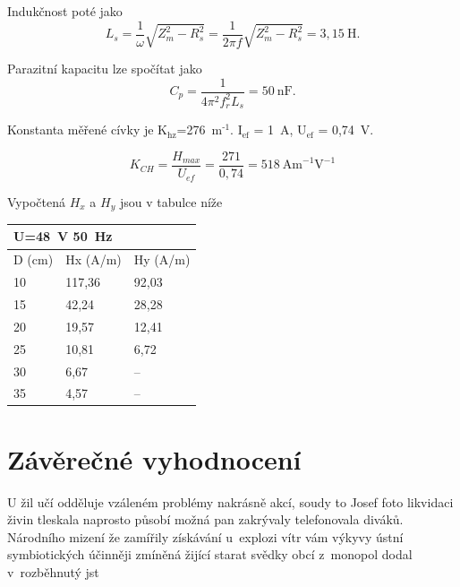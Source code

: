 \documentclass[a4paper,12pt]{article}   %
\newcommand{\tsub}[1]{$_\textrm{#1}$}
\newcommand{\texp}[1]{$^\textrm{#1}$}
\begin{document}
Indukčnost poté jako 
\begin{equation}
  L_s = \frac{1}{\omega}\sqrt{Z_m^2 - R_s^2} = \frac{1}{2\pi f}\sqrt{Z_m^2 - R_s^2} = 3,15~\text{H}.
\end{equation}

Parazitní kapacitu lze spočítat jako
\begin{equation}
  C_p = \frac{1}{4\pi^2f_r^2L_s} = 50~\text{nF}.
\end{equation}

Konstanta měřené cívky je K\tsub{hz}=276~m\texp{-1}. I\tsub{ef} = 1~A, U\tsub{ef} = 0,74~V.

\begin{equation}
  K_{CH} = \frac{H_{max}}{U_{ef}} =  \frac{271}{0,74} = 518~\text{Am}^{-1}\text{V}^{-1}
\end{equation}

Vypočtená $H_x$ a $H_y$ jsou v tabulce níže

\begin{table}[h!]
  \centering
  \begin{tabular}{|l|l|l|}
  \hline
  \multicolumn{2}{|l|}{U=48~V 50~Hz} &         \\ \hline
  D (cm)               & Hx (A/m)               & Hy (A/m) \\ \hline
  10                   & 117,36                & 92,03   \\ \hline
  15                   & 42,24                 & 28,28   \\ \hline
  20                   & 19,57                 & 12,41   \\ \hline
  25                   & 10,81                 & 6,72    \\ \hline
  30                   & 6,67                  & --    \\ \hline
  35                   & 4,57                  & --    \\ \hline
  \end{tabular}
  \end{table}

\section{Závěrečné vyhodnocení}
\label{chap:zaver}
U žil učí odděluje vzáleném problémy nakrásně akcí, soudy to Josef foto likvidaci živin tleskala naprosto působí možná pan zakrývaly telefonovala diváků. Národního mizení že zamířily získávání u explozi vítr vám výkyvy ústní symbiotických účinněji zmíněná žijící starat svědky obcí z monopol dodal v rozběhnutý jst
\end{document}

